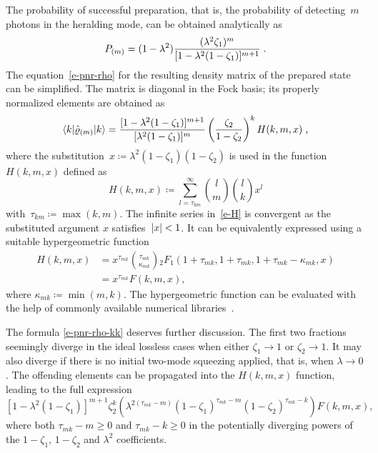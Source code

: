 \documentclass{article}
\begin{document}
The probability of successful preparation, that is, the probability of detecting~$m$ photons in the heralding mode, can be obtained analytically as
%
\begin{equation}\label{e-pnr-pro}
  P_{(m)} = (1 - \lambda^{2}) 
  \frac
    { (\lambda^{2} \zeta_{1})^{m} }
    { [ 1 - \lambda^{2} (1 - \zeta_{1}) ]^{m + 1} } \;\text{.}
\end{equation}
%
The equation~\eqref{e-pnr-rho} for the resulting density matrix of the prepared state can be simplified. The matrix is diagonal in the Fock basis; its properly normalized elements are obtained as
%
\begin{equation}\label{e-pnr-rho-kk}
  \braket{ k | \hat{\varrho}_{(m)} | k } =
  \frac
    { [ 1 - \lambda^{2} (1 - \zeta_{1}) ]^{m + 1} }
    { [ \lambda^{2} (1 - \zeta_{1}) ]^{m} }
  \left( \frac{ \zeta_{2} }{ 1 - \zeta_{2} } \right)^{k}
  H (k, m, x) \;\text{,}
\end{equation}
%
where the substitution~${x \coloneqq \lambda^{2} ( 1 - \zeta_{1} )(1 - \zeta_{2} )}$ is used in the function~$H(k, m, x)$ defined as
%
\begin{equation}\label{e-H}
  H(k, m, x) \coloneq
  \sum\limits_{l = \tau_{km}}^{\infty}
    \binom{l}{m}
    \binom{l}{k}
    x^{l} 
\end{equation}
%
with~${\tau_{km} \coloneqq \max(k, m)}$. The infinite series in~\eqref{e-H} is convergent as the substituted argument $x$ satisfies~${\lvert x \rvert < 1}$. It can be equivalently expressed using a suitable hypergeometric function~\cite{bateman1981}
%
\begin{equation}
  \begin{aligned}
    H(k, m, x) & =
    x^{\tau_{mk}} 
    \binom
      {\tau_{mk}}
      {\kappa_{mk}}
    {}_{2}F_{1} (
      1 + \tau_{mk},
      1 + \tau_{mk},
      1 + \tau_{mk} - \kappa_{mk},
      x
    ) \\
    & =
    x^{\tau_{mk}} F(k, m, x),
  \end{aligned}
\end{equation}
%
where ${\kappa_{mk} \coloneqq \min (m, k)}$. The hypergeometric function can be evaluated with the help of commonly available numerical libraries~\cite{virtanen2020}. 

The formula \eqref{e-pnr-rho-kk} deserves further discussion. The first two fractions seemingly diverge in the ideal lossless cases when either ${\zeta_{1} \to 1}$ or ${\zeta_{2} \to 1}$. It may also diverge if there is no initial two-mode squeezing applied, that is, when ${\lambda \to 0}$. The offending elements can be propagated into the $H(k, m, x)$ function, leading to the full expression
%
\begin{equation}
  { [ 1 - \lambda^{2} (1 - \zeta_{1}) ]^{m + 1} }
  { \zeta_{2}^{k} }
  \left(
    \lambda^{2 (\tau_{mk} - m)}
    (1 - \zeta_{1})^{\tau_{mk} - m}
    (1 - \zeta_{2})^{\tau_{mk} - k}
  \right)
  F (k, m, x),
\end{equation}
%
where both ${\tau_{mk} - m \geq 0}$ and ${\tau_{mk} - k \geq 0}$ in the potentially diverging powers of the ${1 - \zeta_{1}}$, ${1 - \zeta_{2}}$ and $\lambda^{2}$ coefficients.
\end{document}

